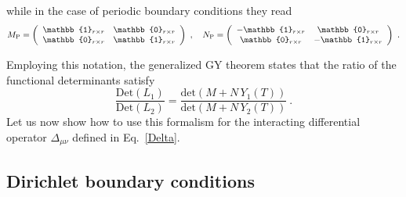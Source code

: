 \documentclass[12pt,a4paper]{article}
\numberwithin{equation}{section}
\numberwithin{equation}{section}
\begin{document}
while in the case of periodic boundary conditions they read
\begin{equation} \label{MN}
M_{\rm P}=\left(
\begin{array}{cc} \mathbb{1}_{r \times r} & \mathbb{0}_{r \times r} \\ \mathbb{0}_{r \times r} & \mathbb{1}_{r \times r} \\
\end{array}\right)\ , \quad 
N_{\rm P}=\left(
\begin{array}{cc} -\mathbb{1}_{r \times r} & \mathbb{0}_{r \times r} \\ \mathbb{0}_{r \times r} & -\mathbb{1}_{r \times r} \\
\end{array}\right)\ .
\end{equation}

Employing this notation, the generalized GY theorem states that the ratio of the functional determinants satisfy
\begin{equation} \label{GY}
\frac{\mathrm{Det}(L_1)}{\mathrm{Det}(L_2)}=\frac{\mathrm{det}(M+N \, Y_1(T))}{\mathrm{det}(M+N \, Y_2(T))}\ .
\end{equation}
Let us now show how to use this formalism for the interacting differential operator $\Delta_{\mu\nu}$ defined in Eq.~\eqref{Delta}. 


\subsection{Dirichlet boundary conditions} \label{appB.2}
\end{document}
